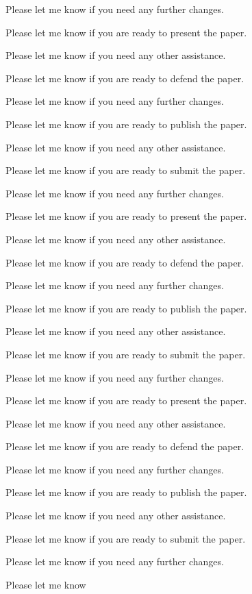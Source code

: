 Please let me know if you need any further changes. 

Please let me know if you are ready to present the paper. 

Please let me know if you need any other assistance. 

Please let me know if you are ready to defend the paper. 

Please let me know if you need any further changes. 

Please let me know if you are ready to publish the paper. 

Please let me know if you need any other assistance. 

Please let me know if you are ready to submit the paper. 

Please let me know if you need any further changes. 

Please let me know if you are ready to present the paper. 

Please let me know if you need any other assistance. 

Please let me know if you are ready to defend the paper. 

Please let me know if you need any further changes. 

Please let me know if you are ready to publish the paper. 

Please let me know if you need any other assistance. 

Please let me know if you are ready to submit the paper. 

Please let me know if you need any further changes. 

Please let me know if you are ready to present the paper. 

Please let me know if you need any other assistance. 

Please let me know if you are ready to defend the paper. 

Please let me know if you need any further changes. 

Please let me know if you are ready to publish the paper. 

Please let me know if you need any other assistance. 

Please let me know if you are ready to submit the paper. 

Please let me know if you need any further changes. 

Please let me know